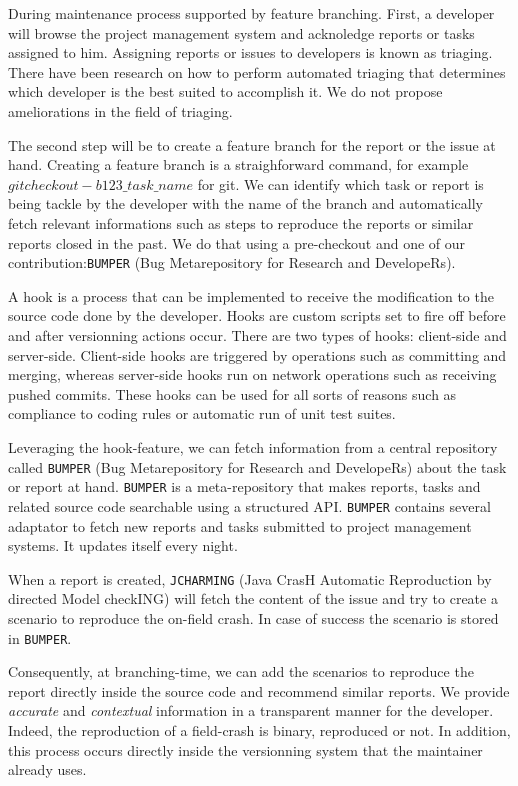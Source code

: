 During maintenance process supported by feature branching.
First, a developer will browse the project management system and acknoledge reports or tasks assigned to him.
Assigning reports or issues to developers is known as triaging.
There have been research on how to perform automated triaging that determines which developer is the best suited to accomplish it\cite{Saha2014, Tamrawi2011, Bortis2013}.
We do not propose ameliorations in the field of triaging.

The second step will be to create a feature branch for the report or the issue at hand.
Creating a feature branch is a straighforward command, for example $git checkout -b 123\_task\_name$ for git.
We can identify which task or report is being tackle by the developer with the name of the branch and automatically fetch relevant informations such as steps to reproduce the reports or similar reports closed in the past.
We do that using a pre-checkout and one of our contribution:{\tt BUMPER} (Bug Metarepository for Research and DevelopeRs).

A hook is a process that can be implemented to receive the  modification to the source code done by the developer.
Hooks are custom scripts set to fire off before and after versionning actions occur.
There are two types of hooks: client-side and server-side.
Client-side hooks are triggered by operations such as committing and merging, whereas server-side hooks run on network operations such as receiving pushed commits.
These hooks can be used for all sorts of reasons such as compliance to coding rules or automatic run of unit test suites.

Leveraging the hook-feature, we can fetch information from a central repository called {\tt BUMPER} (Bug Metarepository for Research and DevelopeRs) about the task or report at hand.
{\tt BUMPER} is a meta-repository that makes reports, tasks and related source code searchable using a structured API.
{\tt BUMPER} contains several adaptator to fetch new reports and tasks submitted to project management systems.
It updates itself every night.

When a report is created, {\tt JCHARMING} (Java CrasH Automatic Reproduction by directed Model checkING) will fetch the content of the issue and try to create a scenario to reproduce the on-field crash.
In case of success the scenario is stored in {\tt BUMPER}.

Consequently, at branching-time, we can add the scenarios to reproduce the report directly inside the source code and recommend similar reports.
We provide {\it accurate} and {\it contextual} information in a transparent manner for the developer.
Indeed, the reproduction of a field-crash is binary, reproduced or not. In addition, this process occurs directly inside the versionning system that the maintainer already uses.

